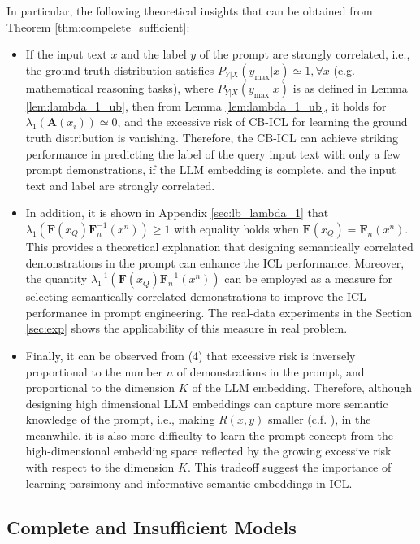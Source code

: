 \documentclass{article} %
\theoremstyle{plain} %
\begin{document}
In particular, the following theoretical insights that can be obtained from Theorem \ref{thm:compelete_sufficient}:
\begin{itemize}
    \item If the input text $x$ and the label $y$ of the prompt are strongly correlated, i.e., the ground truth distribution satisfies $P_{Y|X}(y_{\max}|x)\simeq 1, \forall x$ (e.g. mathematical reasoning tasks), where $P_{Y|X}(y_{\max}|x)$ is as defined in Lemma \ref{lem:lambda_1_ub}, then from Lemma \ref{lem:lambda_1_ub}, it holds for $\lambda_1(\textbf{A}(x_i)) \simeq 0$, and the excessive risk of CB-ICL for learning the ground truth distribution is vanishing. Therefore, the CB-ICL can achieve striking performance in predicting the label of the query input text with only a few prompt demonstrations, if the LLM embedding is complete, and the input text and label are strongly correlated.
    \item In addition, it is shown in Appendix \ref{sec:lb_lambda_1} that $\lambda_1 \left(\mathbf{F}(x_Q)\mathbf{F}_n^{-1}(x^n) \right) \geq 1$ with equality holds when  $\mathbf{F}(x_Q) = \mathbf{F}_n(x^n)$. This provides a theoretical explanation that designing semantically correlated demonstrations in the prompt can enhance the ICL performance. Moreover, the quantity $\lambda_1^{-1} \left(\mathbf{F}(x_Q)\mathbf{F}_n^{-1}(x^n) \right)$ can be employed as a measure for selecting semantically correlated demonstrations to improve the ICL performance in prompt engineering. The real-data experiments in the Section \ref{sec:exp} shows the applicability of this measure in real problem.
    \item Finally, it can be observed from (4) that excessive risk is inversely proportional to the number $n$ of demonstrations in the prompt, and proportional to the dimension $K$ of the LLM embedding. Therefore, although designing high dimensional LLM embeddings can capture more semantic knowledge of the prompt, i.e., making $R(x,y)$ smaller (c.f. \citep{kaplan2020scaling}), in the meanwhile, it is also more difficulty to learn the prompt concept from the high-dimensional embedding space reflected by the growing excessive risk with respect to the dimension $K$. This tradeoff suggest the importance of learning parsimony and informative semantic embeddings in ICL.
\end{itemize}

\subsection{Complete and Insufficient Models}
\end{document}
